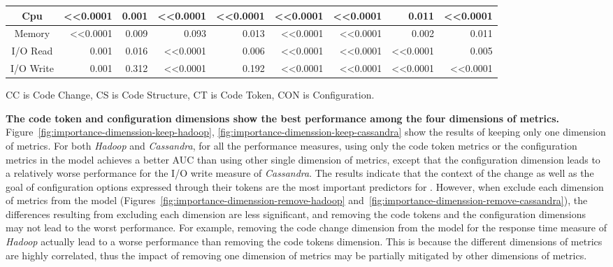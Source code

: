 \begin{table}
\begin{tabular}{|c|r|r|r|r|r|r|r|r|}
    Cpu       & \textless{}\textless{}0.0001 & 0.001  & \textless{}\textless{}0.0001 & \textless{}\textless{}0.0001  & \textless{}\textless{}0.0001   & \textless{}\textless{}0.0001  & 0.011   & \textless{}\textless{}0.0001   \\ \hline
    Memory    & \textless{}\textless{}0.0001 & 0.009  & 0.093  & 0.013   & \textless{}\textless{}0.0001   & \textless{}\textless{}0.0001  & 0.002   & 0.011    \\ \hline
    I/O Read  & 0.001  & 0.016  & \textless{}\textless{}0.0001 & 0.006   & \textless{}\textless{}0.0001   & \textless{}\textless{}0.0001  & \textless{}\textless{}0.0001  & 0.005    \\ \hline
    I/O Write & 0.001  & 0.312  & \textless{}\textless{}0.0001 & 0.192   & \textless{}\textless{}0.0001   & \textless{}\textless{}0.0001  & \textless{}\textless{}0.0001  & \textless{}\textless{}0.0001   \\ \hline
    \end{tabular}
\label{tab:difference}
\footnotesize{CC is Code Change, CS is Code Structure, CT is Code Token, CON is Configuration.}
\end{table}

\textbf{The code token and configuration dimensions show the best performance among the four dimensions of metrics.} Figure~\ref{fig:importance-dimenssion-keep-hadoop}, \ref{fig:importance-dimenssion-keep-cassandra} show the results of keeping only one dimension of metrics. For both \emph{Hadoop} and \emph{Cassandra}, for all the performance measures, using only the code token metrics or the configuration metrics in the model achieves a better AUC than using other single dimension of metrics, except that the configuration dimension leads to a relatively worse performance for the I/O write measure of \emph{Cassandra}.
The results indicate that the context of the change as well as the goal of configuration options expressed through their tokens are the most important predictors for \inconsistent.
However, when exclude each dimension of metrics from the model (Figures~\ref{fig:importance-dimenssion-remove-hadoop} and~\ref{fig:importance-dimenssion-remove-cassandra}), the differences resulting from excluding each dimension are less significant, and removing the code tokens and the configuration dimensions may not lead to the worst performance.
For example, removing the code change dimension from the model for the response time measure of \emph{Hadoop} actually lead to a worse performance than removing the code tokens dimension. 
This is because the different dimensions of metrics are highly correlated, thus the impact of removing one dimension of metrics may be partially mitigated by other dimensions of metrics.

